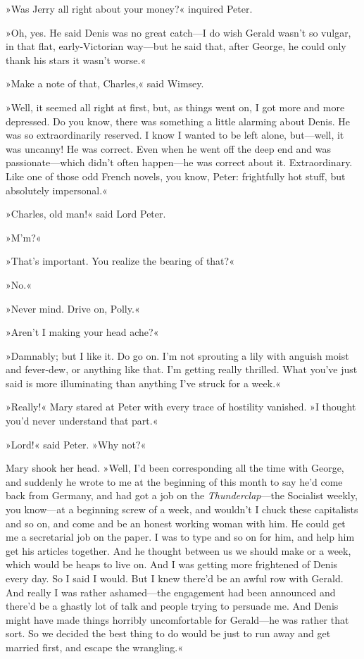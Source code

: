 »Was Jerry all right about your money?« inquired Peter.

»Oh, yes. He said Denis was no great catch—I do wish Gerald wasn't so vulgar, in that flat, early-Victorian way—but he said that, after George, he could only thank his stars it wasn't worse.«

»Make a note of that, Charles,« said Wimsey.

»Well, it seemed all right at first, but, as things went on, I got more and more depressed. Do you know, there was something a little alarming about Denis. He was so extraordinarily reserved. I know I wanted to be left alone, but—well, it was uncanny! He was correct. Even when he went off the deep end and was passionate—which didn't often happen—he was correct about it. Extraordinary. Like one of those odd French novels, you know, Peter: frightfully hot stuff, but absolutely impersonal.«

»Charles, old man!« said Lord Peter.

»M'm?«

»That's important. You realize the bearing of that?«

»No.«

»Never mind. Drive on, Polly.«

»Aren't I making your head ache?«

»Damnably; but I like it. Do go on. I'm not sprouting a lily with anguish moist and fever-dew, or anything like that. I'm getting really thrilled. What you've just said is more illuminating than anything I've struck for a week.«

»Really!« Mary stared at Peter with every trace of hostility vanished.  »I thought you'd never understand that part.«

»Lord!« said Peter. »Why not?«

Mary shook her head. »Well, I'd been corresponding all the time with George, and suddenly he wrote to me at the beginning of this month to say he'd come back from Germany, and had got a job on the \textit{Thunderclap}—the Socialist weekly, you know—at a beginning screw of  a week, and wouldn't I chuck these capitalists and so on, and come and be an honest working woman with him. He could get me a secretarial job on the paper. I was to type and so on for him, and help him get his articles together. And he thought between us we should make  or  a week, which would be heaps to live on. And I was getting more frightened of Denis every day. So I said I would. But I knew there'd be an awful row with Gerald. And really I was rather ashamed—the engagement had been announced and there'd be a ghastly lot of talk and people trying to persuade me. And Denis might have made things horribly uncomfortable for Gerald—he was rather that sort. So we decided the best thing to do would be just to run away and get married first, and escape the wrangling.«

